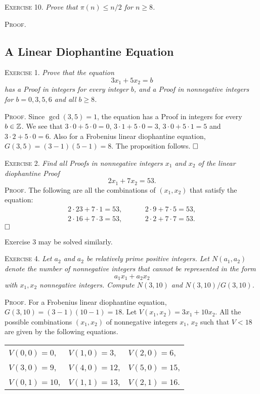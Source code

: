 \documentclass[11pt, leqno]{article}
\newcommand{\done}{\ensuremath{\hfill\square}}
\begin{document}
\textsc{Exercise 10}. \emph{Prove that $\pi(n) \leq n/2$ for $n\geq 8$.}

\textsc{Proof}.

\subsection{A Linear Diophantine Equation}

\textsc{Exercise 1}. \emph{Prove that the equation 
\begin{displaymath}
3x_1 + 5x_2 = b
\end{displaymath}
has a Proof in integers for every integer $b$, and a Proof in nonnegative integers for $b=0,3,5,6$ and all $b\geq 8$.}

\textsc{Proof}. Since $\gcd(3,5) = 1$, the equation has a Proof in integers for every $b\in\mathbb{Z}$. We see that $3\cdot 0 + 5\cdot 0 = 0$, $3\cdot 1 + 5\cdot 0 = 3$, $3\cdot 0 + 5\cdot 1 = 5$ and $3\cdot 2 + 5\cdot 0 = 6$. Also for a Frobenius linear diophantine equation, $G(3,5) = (3-1)(5-1) = 8$. The proposition follows. \done

\textsc{Exercise 2}. \emph{Find all Proofs in nonnegative integers $x_1$ and $x_2$ of the linear diophantine Proof 
\begin{displaymath}
2x_1 + 7x_2 = 53.
\end{displaymath}}\textsc{Proof}. The following are all the combinations of $(x_1, x_2)$ that satisfy the equation: 
\begin{align*}
  2 \cdot 23 + 7 \cdot 1 = 53, \hspace{1cm} & 2 \cdot 9 + 7 \cdot 5 = 53,\\
  2 \cdot 16 + 7 \cdot 3 = 53, \hspace{1cm} & 2 \cdot 2 + 7 \cdot 7 = 53.
\end{align*}
\done

Exercise $3$ may be solved similarly.

\textsc{Exercise 4}. \emph{Let $a_2$ and $a_2$ be relatively prime positive integers. Let $N(a_1, a_2)$ denote the number of nonnegative integers that cannot be represented in the form 
\begin{displaymath}
a_1x_1 + a_2x_2
\end{displaymath}
with $x_1, x_2$ nonnegative integers. Compute $N(3,10)$ and $N(3,10)/G(3,10)$.}

\textsc{Proof}. For a Frobenius linear diophantine equation, $G(3,10) = (3-1)(10-1) = 18$. Let $V(x_1, x_2) = 3x_1 + 10x_2$. All the possible combinations $(x_1, x_2)$ of nonnegative integers $x_1$, $x_2$ such that $V<18$ are given by the following equations.
\begin{longtable}{p{6em} p{6em} p{6em}}
  $V(0, 0) = 0$, & $V(1,0) = 3$, & $V(2,0) = 6$, \\
  $V(3, 0) = 9$, & $V(4, 0) = 12$, & $V(5, 0) = 15$, \\
  $V(0, 1) = 10$, & $V(1, 1) = 13$, & $V(2, 1) = 16$.
\end{longtable}
\reduce
\end{document}

